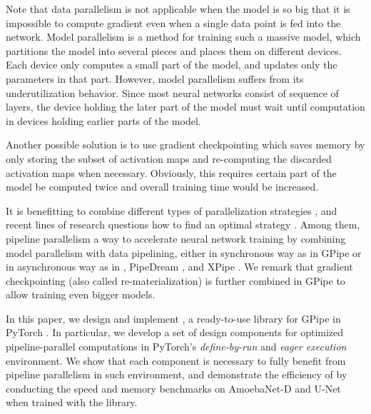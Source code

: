 Note that data parallelism is not applicable when the model is so big that it is impossible to compute gradient even when a single data point is fed into the network. Model parallelism \cite{dean2012large} is a method for training such a massive model, which partitions the model into several pieces and places them on different devices. Each device only computes a small part of the model, and updates only the parameters in that part. However, model parallelism suffers from its underutilization behavior. Since most neural networks consist of sequence of layers, the device holding the later part of the model must wait until computation in devices holding earlier parts of the model. 

Another possible solution is to use gradient checkpointing \cite{chen2016training} which saves memory by only storing the subset of activation maps and re-computing the discarded activation maps when necessary. Obviously, this requires certain part of the model be computed twice and overall training time would be increased. 

It is benefitting to combine different types of parallelization strategies \cite{krizhevsky2014one, pmlr-v80-jia18a, shazeer2018mesh, huo2018decoupled, harlap2018pipedream, huang2019gpipe, guan2019xpipe}, and recent lines of research questions how to find an optimal strategy \cite{jia2018beyond, mirhoseini2017device, mirhoseini2018a, zhou2019gdp}. Among them, pipeline parallelism a way to accelerate neural network training by combining model parallelism with data pipelining, either in synchronous way as in GPipe \cite{huang2019gpipe} or in asynchronous way as in  \cite{huo2018decoupled}, PipeDream \cite{harlap2018pipedream}, and XPipe \cite{guan2019xpipe}. We remark that gradient checkpointing (also called re-materialization) is further combined in GPipe to allow training even bigger models.

In this paper, we design and implement {\torchgpipe}, a ready-to-use library for GPipe in PyTorch \cite{paszke2017automatic}. In particular, we develop a set of design components for optimized pipeline-parallel computations in PyTorch's \emph{define-by-run} and \emph{eager execution} environment. We show that each component is necessary to fully benefit from pipeline parallelism in such environment, and demonstrate the efficiency of {\torchgpipe} by conducting the speed and memory benchmarks on AmoebaNet-D \cite{real2019regularized} and U-Net \cite{RonnebergerFB15} when trained with the library.

